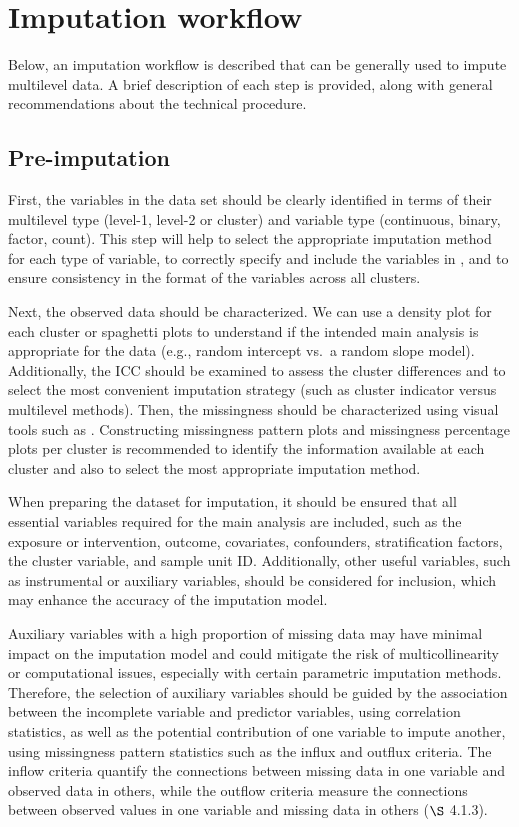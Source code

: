 \documentclass[
  article]{jss}
\begin{document}
\section{Imputation workflow}\label{imputation-workflow}

Below, an imputation workflow is described that can be generally used to
impute multilevel data. A brief description of each step is provided,
along with general recommendations about the technical procedure.

\subsection{Pre-imputation}\label{pre-imputation}

First, the variables in the data set should be clearly identified in
terms of their multilevel type (level-1, level-2 or cluster) and
variable type (continuous, binary, factor, count). This step will help
to select the appropriate imputation method for each type of variable,
to correctly specify and include the variables in , and to
ensure consistency in the format of the variables across all clusters.

Next, the observed data should be characterized. We can use a density
plot for each cluster or spaghetti plots to understand if the intended
main analysis is appropriate for the data (e.g., random intercept vs.~a
random slope model). Additionally, the ICC should be examined to assess
the cluster differences and to select the most convenient imputation
strategy (such as cluster indicator versus multilevel methods). Then,
the missingness should be characterized using visual tools such as
 \citep{ggmice2023}. Constructing missingness pattern plots
and missingness percentage plots per cluster is recommended to identify
the information available at each cluster and also to select the most
appropriate imputation method.

When preparing the dataset for imputation, it should be ensured that all
essential variables required for the main analysis are included, such as
the exposure or intervention, outcome, covariates, confounders,
stratification factors, the cluster variable, and sample unit ID.
Additionally, other useful variables, such as instrumental or auxiliary
variables, should be considered for inclusion, which may enhance the
accuracy of the imputation model.

Auxiliary variables with a high proportion of missing data may have
minimal impact on the imputation model and could mitigate the risk of
multicollinearity or computational issues, especially with certain
parametric imputation methods. Therefore, the selection of auxiliary
variables should be guided by the association between the incomplete
variable and predictor variables, using correlation statistics, as well
as the potential contribution of one variable to impute another, using
missingness pattern statistics such as the influx and outflux criteria.
The inflow criteria quantify the connections between missing data in one
variable and observed data in others, while the outflow criteria measure
the connections between observed values in one variable and missing data
in others \citep{buur18} (\(\S\) 4.1.3).
\end{document}
